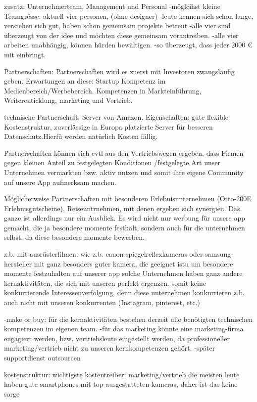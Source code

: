  zusatz:
 Unternehmerteam, Management und Personal
-möglcihst kleine Teamgrösse: aktuell vier personen, (ohne designer)
-leute kennen sich schon lange, verstehen sich gut, haben schon gemeinsam projekte betreut
-alle vier sind überzeugt von der idee und möchten diese gemeinsam vorantreiben.
-alle vier arbeiten unabhängig, können hürden bewältigen.
-so überzeugt, dass jeder 2000 € mit einbringt.
 
 Partnerschaften:
 Partnerschaften wird es zuerst mit Investoren zwangsläufig geben.
 Erwartungen an diese: Startup Kompetenz im Medienbereich/Werbebereich.
 Kompetenzen in Markteinführung, Weiterenticklung, marketing und Vertrieb.
 
 technische Partnerschaft: Server von Amazon. 
 Eigenschaften: gute flexible Kostenstruktur, zuverlässige in Europa platzierte 
 Server für besseren Datenschutz.Hierfü werden natürlich Kosten fällig.
 
 Partnerschaften können sich evtl aus den Vertriebswegen ergeben, dass Firmen
 gegen kleinen Anteil zu festgelegten Konditionen /festgelegte Art unser Unternehmen vermarkten
 bzw. aktiv nutzen und somit ihre eigene Community auf unsere App aufmerksam machen.
 
 Möglicherweise Partnerschaften mit besonderen Erlebnisunternehmen (Otto-200E Erlebnisgutscheine), Reiseuntrnehmen,
 mit denen ergeben sich synergien. Das ganze ist allerdings nur ein Ausblick.
 Es wird nicht nur werbung für unsere app gemacht, die ja besondere momente festhält, sondern auch für die unternehmen selbst,
 da diese besondere momente bewerben.
 
 z.b. mit ausrüsterfilmen: wie z.b. canon spiegelreflexkameras oder samsung-hersteller mit ganz besonders guter kamera, die geeignet istu
 um besondere momente festzuhalten auf unserer app
 solche Unternehmen haben ganz andere kernaktivitäten, die sich mit unseren perfekt ergenzen.
 somit keine konkurrierende Interessenverfolgung, denn diese unternehmen konkurrieren z.b.
 auch nicht mit unseren konkurrenten (Instagram, pinterest, etc.)
 
 -make or buy:
 für die kernaktivitäten bestehen derzeit alle benötigten technischen kompetenzen im eigenen team.
 -für das marketing könnte eine marketing-firma engagiert werden, bzw. vertriebsleute eingestellt werden,
 da professioneller marketing/vertrieb nicht zu unseren kernkompetenzen gehört.
 -später supportdienst outsourcen

 kostenstruktur: wichtigste kostentreiber:
 marketing/vertrieb
 die meisten leute haben gute smartphones mit top-ausgestatteten kameras, daher ist das keine sorge
 
